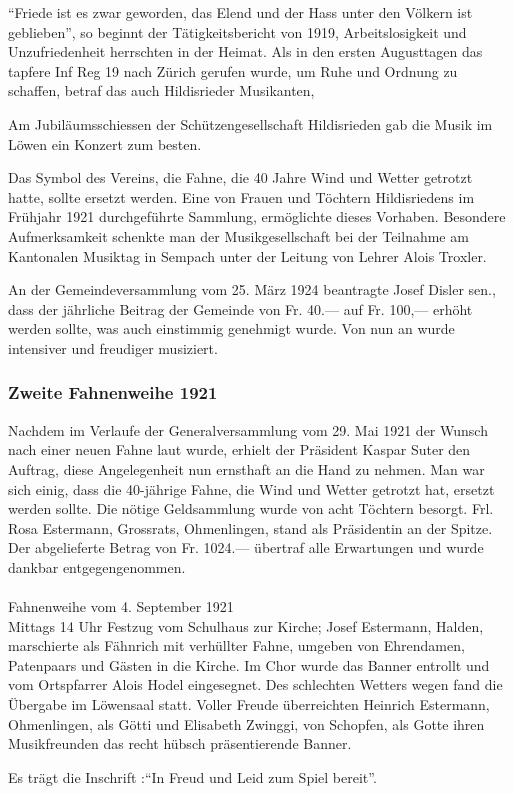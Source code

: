 \begin{history}
    \enquote{Friede ist es zwar geworden, das Elend und der Hass unter den
        Völkern ist geblieben}, so beginnt der Tätigkeitsbericht von 1919,
    Arbeitslosigkeit und Unzufriedenheit herrschten in der Heimat. Als in
    den ersten Augusttagen das tapfere Inf Reg 19 nach Zürich gerufen wurde,
    um Ruhe und Ordnung zu schaffen, betraf das auch Hildisrieder
    Musikanten,

    Am Jubiläumsschiessen der Schützengesellschaft Hildisrieden gab die Musik im
    Löwen ein Konzert zum besten.

    Das Symbol des Vereins, die Fahne, die 40 Jahre Wind und Wetter getrotzt
    hatte, sollte ersetzt werden. Eine von Frauen und Töchtern Hildisriedens im
    Frühjahr 1921 durchgeführte Sammlung, ermöglichte dieses Vorhaben. Besondere
    Aufmerksamkeit schenkte man der Musikgesellschaft bei der Teilnahme am
    Kantonalen Musiktag in Sempach unter der Leitung von Lehrer Alois Troxler.

    An der Gemeindeversammlung vom 25. März 1924 beantragte Josef Disler sen.,
    dass der jährliche Beitrag der Gemeinde von Fr. 40.— auf Fr. 100,— erhöht
    werden sollte, was auch einstimmig genehmigt wurde. Von nun an wurde
    intensiver und freudiger musiziert.

    \subsubsection*{Zweite Fahnenweihe 1921}

    Nachdem im Verlaufe der Generalversammlung vom 29. Mai 1921 der Wunsch nach
    einer neuen Fahne laut wurde, erhielt der Präsident Kaspar Suter den
    Auftrag, diese Angelegenheit nun ernsthaft an die Hand zu nehmen. Man war
    sich einig, dass die 40-jährige Fahne, die Wind und Wetter getrotzt hat,
    ersetzt werden sollte. Die nötige Geldsammlung wurde von acht Töchtern
    besorgt. Frl. Rosa Estermann, Grossrats, Ohmenlingen, stand als Präsidentin
    an der Spitze. Der abgelieferte Betrag von Fr. 1024.— übertraf alle
    Erwartungen und wurde dankbar entgegengenommen.\\
    \\
    Fahnenweihe vom 4. September 1921\\
    Mittags 14 Uhr Festzug vom Schulhaus zur Kirche; Josef Estermann, Halden,
    marschierte als Fähnrich mit verhüllter Fahne, umgeben von Ehrendamen,
    Patenpaars und Gästen in die Kirche. Im Chor wurde das Banner entrollt und
    vom Ortspfarrer Alois Hodel eingesegnet. Des schlechten Wetters wegen fand
    die Übergabe im Löwensaal statt. Voller Freude überreichten Heinrich
    Estermann, Ohmenlingen, als Götti und Elisabeth Zwinggi, von Schopfen, als
    Gotte ihren Musikfreunden das recht hübsch präsentierende Banner.

    Es trägt die Inschrift :\enquote{In Freud und Leid zum Spiel bereit}.

\end{history}


